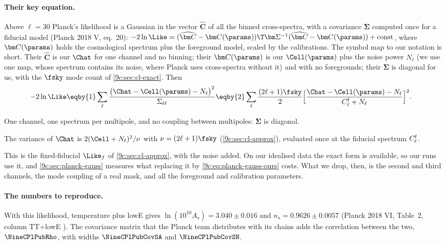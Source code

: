 \paragraph{Their key equation.} Above $\ell=30$ Planck's likelihood is a Gaussian in the vector $\widehat{\bm C}$ of all
the binned cross-spectra, with a covariance $\bm\Sigma$ computed once for a fiducial model (Planck 2018 V, eq.~20):
$-2\ln\Like=(\widehat{\bm C}-\bm C(\params))\T\bm\Sigma^{-1}(\widehat{\bm C}-\bm C(\params))+\text{const}$, where $\bm C(\params)$
holds the cosmological spectrum plus the foreground model, scaled by the calibrations. The symbol map to our
notation is short. Their $\widehat{\bm C}$ is our $\Chat$ for one channel and no binning; their $\bm C(\params)$ is our
$\Cell(\params)$ plus the noise power $N_\ell$ (we use one map, whose spectrum contains its noise, where Planck uses
cross-spectra without it) and with no foregrounds; their $\bm\Sigma$ is diagonal for us, with the $\fsky$ mode count of
\cref{9c:sec:cl-exact}. Then
\begin{align}
  -2\ln\Like
  &\eqby{1}\sum_\ell\frac{\bigl(\Chat-\Cell(\params)-N_\ell\bigr)^2}{\Sigma_{\ell\ell}}
   \eqby{2}\sum_\ell\frac{(2\ell+1)\fsky}{2}\Bigl[\frac{\Chat-\Cell(\params)-N_\ell}{C^{\rm f}_\ell+N_\ell}\Bigr]^2 .
  \label{9c:eq:planck-gauss-ours}
\end{align}
\begin{explain}
  \item One channel, one spectrum per multipole, and no coupling between multipoles: $\bm\Sigma$ is diagonal.
  \item The variance of $\Chat$ is $2(\Cell+N_\ell)^2/\nu$ with $\nu=(2\ell+1)\fsky$ (\cref{9c:sec:cl-approx}), evaluated
        once at the fiducial spectrum $C^{\rm f}_\ell$.
\end{explain}
This is the fixed-fiducial $\Like_f$ of \cref{9c:sec:cl-approx}, with the noise added. On our idealised data the exact
form is available, so our runs use it, and \cref{9c:sec:planck-gauss} measures what replacing it by
\eqref{9c:eq:planck-gauss-ours} costs. What we drop, then, is the second and third channels, the mode coupling of a
real mask, and all the foreground and calibration parameters.

\paragraph{The numbers to reproduce.} With this likelihood, temperature plus lowE gives
$\ln(10^{10}A_s)=3.040\pm0.016$ and $n_s=0.9626\pm0.0057$ (Planck 2018 VI, Table~2, column TT+lowE
\cite{Planck2018VI}). The covariance matrix that the Planck team distributes with its chains adds the correlation
between the two, $\NineCPlPubRho$, with widths $\NineCPlPubCovSA$ and $\NineCPlPubCovSN$.

